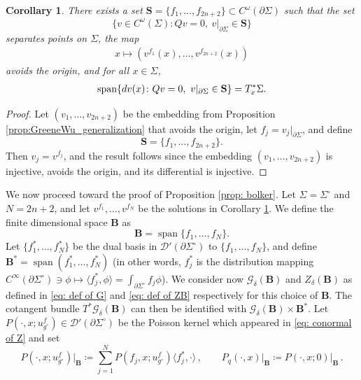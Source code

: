 \documentclass[11pt]{amsart}
\newtheorem{Corollary}[Theorem]{Corollary}
\theoremstyle{definition}
\numberwithin{equation}{section}
\newcommand{\G}{\mathcal G}
\newcommand{\p}{\partial}
\newcommand{\BB}{\mathbf B}
\newcommand{\SSS}{\mathbf S}
\begin{document}
\begin{Corollary}\label{cor:Greene_wu_cor}
There exists a set $\SSS = \{ f_1, \ldots, f_{2n+2} \} \subset C^\omega(\partial\Sigma)$ such that the set 
$$\{v\in C^\omega(\Sigma) \colon %
Qv=0,\  v\vert_{\partial\Sigma}\in \SSS\}$$
separates points on $\Sigma$, the map 
\begin{eqnarray}\label{eq: embedding avoiding zero}
x\mapsto (v^{f_1}(x),\dots , v^{f_{2n+2}}(x))
\end{eqnarray}
avoids the origin, and for all $x\in\Sigma$, 
\begin{eqnarray}\label{eq: full span''}
{\rm span}\{dv(x) \colon %
Qv=0, \  
v\vert_{\partial \Sigma} \in \SSS\} = T^*_x\Sigma.
\end{eqnarray}
\end{Corollary}
\begin{proof}
Let $(v_1, \ldots, v_{2n+2})$ be the embedding from Proposition \ref{prop:GreeneWu_generalization} that avoids the origin, let $f_j = v_j|_{\p \Sigma}$, and define 
\[
\SSS = \{ f_1, \ldots, f_{2n+2} \}.
\]
Then $v_j = v^{f_j}$, and the result follows since the embedding $(v_1, \ldots, v_{2n+2})$ is injective, avoids the origin, and its differential is injective.
\end{proof}

We now proceed toward the proof of Proposition \ref{prop: bolker}. Let $\Sigma = \Sigma^\circ$ and $N=2n+2$, and let $v^{f_1}, \ldots, v^{f_{N}}$ be the solutions in Corollary \ref{cor:Greene_wu_cor}. We define the finite dimensional space $\BB$ as 
\[
\BB = \operatorname{span}\{ f_1, \ldots, f_N \}.
\]
Let $\{f_1^*, \dots, f_N^*\}$ be the dual basis in $\mathcal{D}'(\partial\Sigma^\circ)$ to $\{f_1, \dots, f_N\}$, and define $\BB^* = \operatorname{span}(f_1^*,\dots, f_N^*)$ (in other words, $f^\ast_j$ is the distribution mapping $C^\infty(\partial\Sigma^\circ)\ni \phi\mapsto \langle f^\ast_j ,\phi\rangle =  \int_{\partial\Sigma^\circ} f_j\phi $).
         We consider now $\G_\delta(\BB)$ and $Z_\delta(\BB)$ as defined in \eqref{eq: def of G} and \eqref{eq: def of ZB} respectively for this choice of $\BB$. The cotangent bundle $T^*\G_\delta(\BB)$ can then be identified with $\G_\delta(\BB)\times \BB^*$. Let  $P(\cdot, x; u^f_{g^\circ}) \in \mathcal{D}'(\partial\Sigma^\circ)$ be the Poisson kernel which appeared in \eqref{eq: conormal of Z} and set 
\begin{equation}\label{eq: P as a covector}
	P(\cdot, x; u^f_{g^\circ})\vert_\BB \coloneqq \sum\limits_{j=1}^N P(f_j, x; u^f_{g^\circ}) \langle f_j^*,\cdot \rangle\,,\qquad P_q(\cdot,x)\vert_\BB \coloneqq P(\cdot, x; 0)\vert_\BB\,.
\end{equation}
\end{document}

